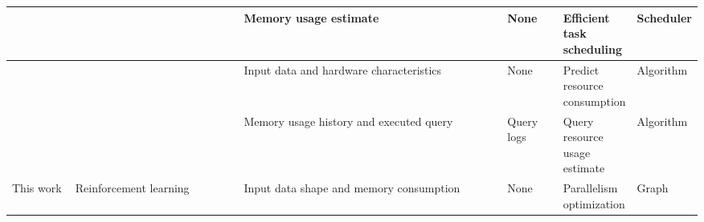 \begin{table}[ht]
{\begin{tabular}{@{}|p{0.11\linewidth}|p{0.3\linewidth}|p{0.5\linewidth}|p{0.3\linewidth}|p{0.3\linewidth}|p{0.2\linewidth}|@{}}
      \cite{goponenko2020} &                                      & Memory usage estimate                                        & None                                     & Efficient task scheduling      & Scheduler            \\ \midrule
      \cite{duplyakin2018} &                                      & Input data and hardware characteristics                      & None                                     & Predict resource consumption   & Algorithm            \\ \midrule
      \cite{tang2021}      &                                      & Memory usage history and executed query                      & Query logs                               & Query resource usage estimate  & Algorithm            \\ \midrule
      This work            & Reinforcement learning                                        & Input data shape and memory consumption                                                                 & None                                            & Parallelism optimization       & Graph                \\ \midrule
    \end{tabular}
  }
\end{table}
